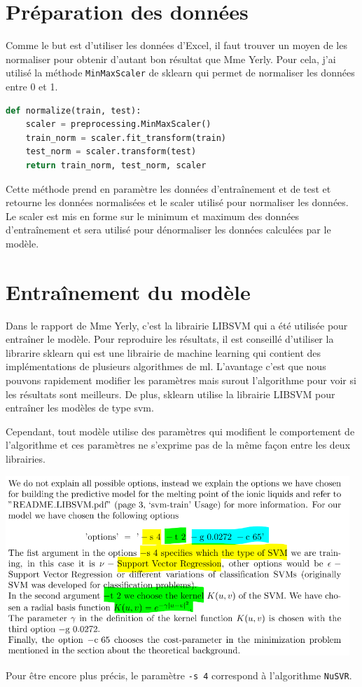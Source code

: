 \section{Préparation des données}
Comme le but est d'utiliser les données d'Excel, il faut trouver un moyen de les normaliser pour obtenir d'autant bon résultat que Mme Yerly.
Pour cela, j'ai utilisé la méthode \texttt{MinMaxScaler} de \acrlong{sklearn} qui permet de normaliser les données entre 0 et 1.
\begin{lstlisting}[language=Python]
def normalize(train, test):
    scaler = preprocessing.MinMaxScaler()
    train_norm = scaler.fit_transform(train)
    test_norm = scaler.transform(test)
    return train_norm, test_norm, scaler
\end{lstlisting}
Cette méthode prend en paramètre les données d'entraînement et de test et retourne les données normalisées et le scaler utilisé pour normaliser les données.
Le scaler est mis en forme sur le minimum et maximum des données d'entraînement et sera utilisé pour dénormaliser les données calculées par le modèle.


\section{Entraînement du modèle}
Dans le rapport\cite{IL_SVM_report} de Mme Yerly, c'est la librairie LIBSVM qui a été utilisée pour entraîner le modèle.
Pour reproduire les résultats, il est conseillé d'utiliser la librarire \acrlong{sklearn} qui est une librairie de machine learning qui contient des implémentations de plusieurs algorithmes de \acrlong{ml}.
L'avantage c'est que nous pouvons rapidement modifier les paramètres mais surout l'algorithme pour voir si les résultats sont meilleurs.
De plus, \acrlong{sklearn} utilise la librairie LIBSVM pour entraîner les modèles de type \acrshort{svm}.

Cependant, tout modèle utilise des paramètres qui modifient le comportement de l'algorithme et ces paramètres ne s'exprime pas de la même façon entre les deux librairies.
\begin{center}
    \includegraphics[width=130mm]{img/report-parameter.png}
\end{center}
Pour être encore plus précis, le paramètre \texttt{-s 4} correspond à l'algorithme \texttt{NuSVR}.


